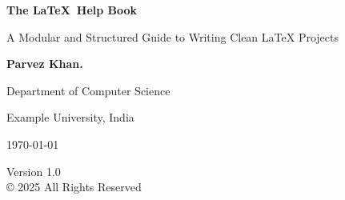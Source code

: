 \begin{titlepage}
    \centering
    
    \vspace*{2cm}
    
    {\Huge\bfseries The \LaTeX\ Help Book \par}
    \vspace{1cm}
    
    {\Large A Modular and Structured Guide to Writing Clean LaTeX Projects \par}
    \vspace{2cm}
    
    {\Large \textbf{Parvez Khan.} \par}
    {\large Department of Computer Science \par}
    {\large Example University, India \par}
    \vfill
    
    {\large \today \par}
    
    \vspace{1cm}
    {\small Version 1.0 \\ © 2025 All Rights Reserved}
\end{titlepage}

